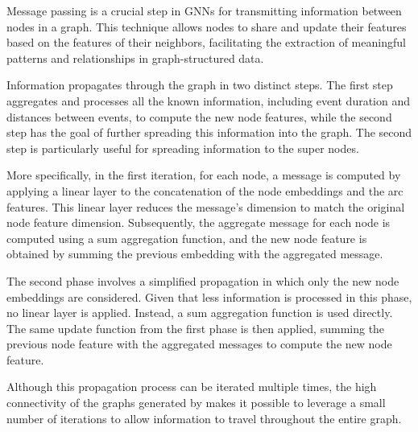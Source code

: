 Message passing is a crucial step in GNNs for transmitting information between nodes in a graph. This technique allows nodes to share and update their features based on the features of their neighbors, facilitating the extraction of meaningful patterns and relationships in graph-structured data. 

Information propagates through the graph in two distinct steps. The first step aggregates and processes all the known information, including event duration and distances between events, to compute the new node features, while the second step has the goal of further spreading this information into the graph. The second step is particularly useful for spreading information to the super nodes.

More specifically, in the first iteration, for each node, a message is computed by applying a linear layer to the concatenation of the node embeddings and the arc features. This linear layer reduces the message's dimension to match the original node feature dimension. Subsequently, the aggregate message for each node is computed using a sum aggregation function, and the new node feature is obtained by summing the previous embedding with the aggregated message.

The second phase involves a simplified propagation in which only the new node embeddings are considered. Given that less information is processed in this phase, no linear layer is applied. Instead, a sum aggregation function is used directly. The same update function from the first phase is then applied, summing the previous node feature with the aggregated messages to compute the new node feature.

Although this propagation process can be iterated multiple times, the high connectivity of the graphs generated by \acronym{} makes it possible to leverage a small number of iterations to allow information to travel throughout the entire graph.


